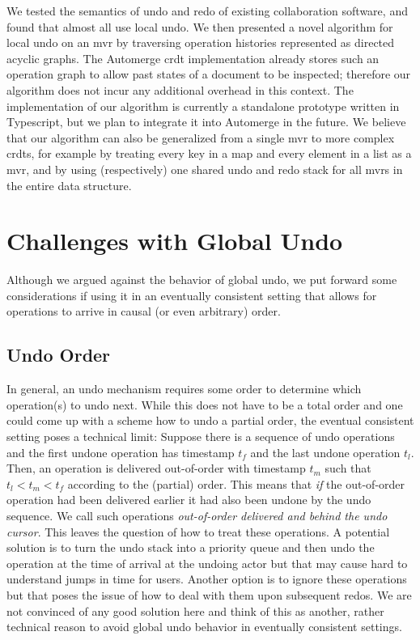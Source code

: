 \documentclass[sigplan,natbib=false,review]{acmart}
\begin{document}
We tested the semantics of undo and redo of existing collaboration software,
and found that almost all use local undo.
We then presented a novel algorithm for local undo on an \gls*{mvr}
by traversing operation histories represented as directed acyclic graphs.
The Automerge \gls{crdt} implementation already stores such an operation graph
to allow past states of a document to be inspected;
therefore our algorithm does not incur any additional overhead in this context.
The implementation of our algorithm is currently a standalone prototype
written in Typescript, but we plan to integrate it into Automerge in the future.
We believe that our algorithm can also be generalized from a single \gls{mvr}
to more complex \glspl{crdt}, for example by treating every key in a map and
every element in a list as a \gls{mvr}, and by using (respectively) one shared
undo and redo stack for all \glspl{mvr} in the entire data structure.

\printbibliography

\appendix

\section{Challenges with Global Undo}\label{adx:global-undo-challenges}

Although we argued against the behavior of global undo, we put forward
some considerations if using it in an eventually consistent setting that
allows for operations to arrive in causal (or even arbitrary) order.

\subsection{Undo Order}

In general, an undo mechanism requires some order to determine which
operation(s) to undo next. 
While this does not have to be a total order and
one could come up with a scheme how to undo a partial order,
the eventual consistent setting poses a technical limit:
Suppose there is a sequence of undo operations and the first undone operation
has timestamp $t_f$ and the last undone operation $t_l$.
Then, an operation is delivered out-of-order with
timestamp $t_m$ such that $t_l < t_m < t_f$ according to the (partial) order.
This means that \emph{if} the out-of-order operation had been delivered earlier it
had also been undone by the undo sequence.
We call such operations \emph{out-of-order delivered and behind the undo cursor}.
This leaves the question of how to treat these operations.
A potential solution is to turn the undo stack into a priority queue and
then undo the operation at the time of arrival at the undoing actor but
that may cause hard to understand jumps in time for users.
Another option is to ignore these operations but that poses the issue of
how to deal with them upon subsequent redos.
We are not convinced of any good solution here and think of this as another,
rather technical reason to avoid global undo behavior in eventually consistent
settings.
\end{document}
